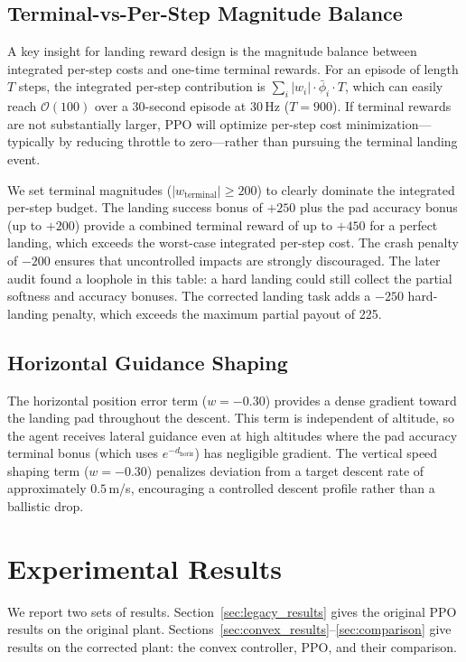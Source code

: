 \documentclass[conference]{IEEEtran}
\begin{document}
\subsection{Terminal-vs-Per-Step Magnitude Balance}

A key insight for landing reward design is the magnitude balance between integrated per-step costs and one-time terminal rewards. For an episode of length $T$ steps, the integrated per-step contribution is $\sum_i |w_i| \cdot \bar{\phi}_i \cdot T$, which can easily reach $\mathcal{O}(100)$ over a 30-second episode at 30\,Hz ($T = 900$). If terminal rewards are not substantially larger, PPO will optimize per-step cost minimization---typically by reducing throttle to zero---rather than pursuing the terminal landing event.

We set terminal magnitudes ($|w_{\text{terminal}}| \geq 200$) to clearly dominate the integrated per-step budget. The landing success bonus of $+250$ plus the pad accuracy bonus (up to $+200$) provide a combined terminal reward of up to $+450$ for a perfect landing, which exceeds the worst-case integrated per-step cost. The crash penalty of $-200$ ensures that uncontrolled impacts are strongly discouraged. The later audit found a loophole in this table: a hard landing could still collect the partial softness and accuracy bonuses. The corrected landing task adds a $-250$ hard-landing penalty, which exceeds the maximum partial payout of 225.

\subsection{Horizontal Guidance Shaping}

The horizontal position error term ($w = -0.30$) provides a dense gradient toward the landing pad throughout the descent. This term is independent of altitude, so the agent receives lateral guidance even at high altitudes where the pad accuracy terminal bonus (which uses $e^{-d_{\text{horiz}}}$) has negligible gradient. The vertical speed shaping term ($w = -0.30$) penalizes deviation from a target descent rate of approximately $0.5$\,m/s, encouraging a controlled descent profile rather than a ballistic drop.


\section{Experimental Results}

We report two sets of results. Section~\ref{sec:legacy_results} gives the original PPO results on the original plant. Sections~\ref{sec:convex_results}--\ref{sec:comparison} give results on the corrected plant: the convex controller, PPO, and their comparison.
\end{document}
